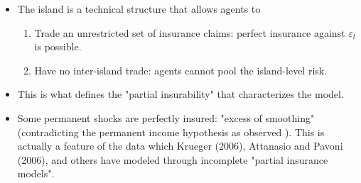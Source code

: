\documentclass[notes=show]{beamer}
\begin{document}
\begin{frame}%



\begin{itemize}
\item The island is a technical structure that allows agents to

\begin{enumerate}
\item Trade an unrestricted set of insurance claims: perfect insurance
against $\varepsilon _{t}$ is possible.

\item Have no inter-island trade: agents cannot pool the island-level risk.
\end{enumerate}

\item This is what defines the "partial insurability" that characterizes the
model.

\item Some permanent shocks are perfectly insured: "excess of smoothing"
(contradicting the permanent income hypothesis as observed ). This is
actually a feature of the data which Krueger (2006), Attanasio and Pavoni
(2006), and others have modeled through incomplete "partial insurance
models".
\end{itemize}

\transboxout%
\end{frame}%

\bigskip 
\end{document}

